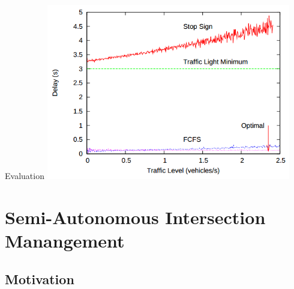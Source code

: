\documentclass{beamer}
\begin{document}
\begin{frame}{Evaluation}
	\includegraphics[width=0.8\textwidth]{old_result.png}
\end{frame}

\section{Semi-Autonomous Intersection Manangement}

\subsection{Motivation}
\end{document}
